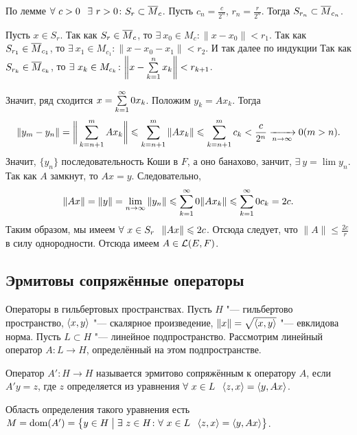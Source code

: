 \begin{Proof}
  По лемме $\forall\ c>0\pau \exists\ r>0\colon S_r\subset \ol M_c$. Пусть $c_n = \frac{c}{2^n}$, $r_n=\frac{r}{2^n}$. Тогда $S_{r_n}\subset\overline{M}_{c_n}$.

Пусть $x\in S_r$. 
Так как $S_r\in\overline{M}_c$, то $\exists\ x_0\in M_c\colon \|x-x_0\|<r_1$.
Так как $S_{r_1}\in\overline{M}_{c_1}$, то $\exists\ x_1\in M_{c_1}\colon \|x-x_0-x_1\|<r_2$. И так далее по индукции
Так как $S_{r_k}\in\overline{M}_{c_k}$, то $\exists\ x_k\in M_{c_k}\colon \bigg\|x-\sum\limits_{k = 1}^{n}x_k\bigg\|<r_{k+1}$.

Значит, ряд сходится $x = \sum\limits_{{k}={1}}^\infty0x_k$. Положим $y_k = Ax_k$. Тогда
\[
  \|y_m-y_n\| = \bigg\|\sum\limits_{k = n+1}^{m}Ax_k\bigg\|\leqslant \sum\limits_{k = n+1}^{m}\|Ax_k\|\leqslant
  \sum\limits_{k = n+1}^{m}c_k<\frac{c}{2^n}\xrightarrow[n\rightarrow\infty]{}0 (m>n).
\]
Значит, $\{y_n\}$ последовательность Коши в $F$, а оно банахово, занчит, $\exists\ y = \lim y_n$. Так как $A$ замкнут, то $Ax = y$.
Следовательно, 
\[
\|Ax\| = \|y\| = \lim\limits_{n\rightarrow\infty}\|y_n\|\leqslant \sum\limits_{{k}={1}}^\infty0\|Ax_k\|\leqslant
  \sum\limits_{{k}={1}}^\infty0 c_k = 2c.
 \]
Таким образом, мы имеем $\forall\ x\in S_r\pau \|A x\|\le 2c$. Отсюда следует, что $\|A\|\le\frac{2c}{r}$ в силу однородности. Отсюда имеем $A\in \mathcal L(E,F)$.
\end{Proof}

\subsection{Эрмитовы сопряжённые операторы}
Операторы в гильбертовых пространствах. Пусть $H$ "--- гильбертово пространство, $\langle x,y\rangle $ "--- скалярное произведение, $\|x\| = \sqrt{ \langle x,y\rangle }$ "--- евклидова норма. Пусть $L\subset H$ "--- линейное подпространство. Рассмотрим линейный оператор $A\colon L\to H$, определённый на этом подпространстве.
\begin{Def}
 Оператор $A'\colon H\to H$ называется эрмитово сопряжённым к оператору $A$, если $A'y = z$, где $z$ определяется из уравнения $\forall\ x\in L\pau \la z,x\ra = \la y, Ax\ra$.
\end{Def}
Область определения такого уравнения есть $M = \operatorname{dom}(A') = \big\{y\in H\bigm|\exists\ z\in H\colon \forall\ x\in L\hskip .75em plus.1em minus.08em\relax \langle z,x\rangle = \langle y,Ax\rangle\big\}$.

